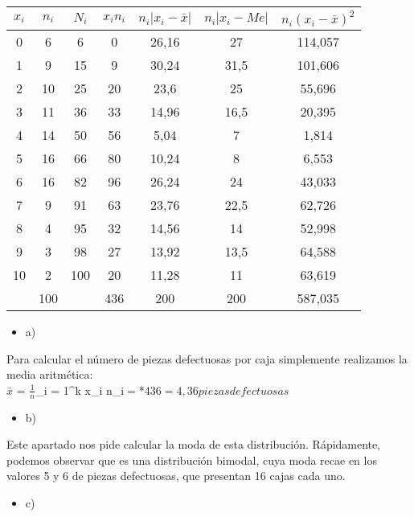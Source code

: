 \documentclass[a4paper,12pt]{article}
\begin{document}
\begin{center}
    \begin{tabular}{|c|c|c|c|c|c|c|}
        \hline
        $x_i$ & $n_i$  & $N_i$ & $x_i n_i$ & $n_i |x_i - \bar x|$ & $n_i |x_i - Me|$ & $n_i (x_i - \bar x)^2$\\
        \hline
        0 & 6 & 6 & 0 & 26,16 & 27 & 114,057 \\
        1 & 9 & 15 & 9 & 30,24 & 31,5 & 101,606 \\
        2 & 10 & 25 & 20 & 23,6 & 25 & 55,696 \\
        3 & 11 & 36 & 33 & 14,96 & 16,5 & 20,395\\
        4 & 14 & 50 & 56 & 5,04 & 7 & 1,814\\
        5 & 16 & 66 & 80 & 10,24 & 8 & 6,553\\
        6 & 16 & 82 & 96 & 26,24 & 24 & 43,033\\
        7 & 9 & 91 & 63 & 23,76 & 22,5 & 62,726\\
        8 & 4 & 95 & 32 & 14,56 & 14 & 52,998\\
        9 & 3 & 98 & 27 & 13,92 & 13,5 & 64,588\\
        10 & 2  & 100 & 20 & 11,28 & 11 & 63,619\\
        \hline
        & 100 & & 436 & 200 & 200 & 587,035 \\
        \hline
    \end{tabular}
\end{center}

\begin {itemize}
    \item [a)]  
\end {itemize}

Para calcular el número de piezas defectuosas por caja simplemente realizamos la media aritmética: \\

    $\bar x$ = $\frac {1}{n} $\sum\limits_{i = 1}^k {x_i n_i}$ = $*436$ = 4,36 piezas defectuosas$

\begin {itemize}
    \item [b)]  
\end {itemize}

    Este apartado nos pide calcular la moda de esta distribución. Rápidamente, podemos observar que es una distribución bimodal, cuya moda recae en los valores 5 y 6 de piezas defectuosas, que presentan 16 cajas cada uno.

\begin {itemize}
    \item [c)]  
\end {itemize}
\end{document}
